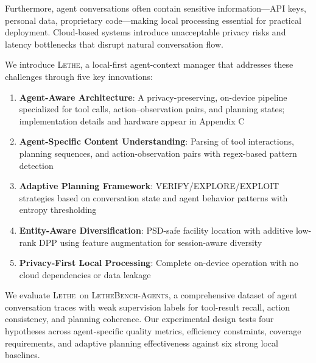 \documentclass[letterpaper]{article}
\newcommand{\lethe}{\textsc{Lethe}}
\newcommand{\lethebench}{\textsc{LetheBench-Agents}}
\begin{document}
Furthermore, agent conversations often contain sensitive information—API keys, personal data, proprietary code—making local processing essential for practical deployment. Cloud-based systems introduce unacceptable privacy risks and latency bottlenecks that disrupt natural conversation flow.

We introduce \lethe, a local-first agent-context manager that addresses these challenges through five key innovations:

\begin{enumerate}
    \item \textbf{Agent-Aware Architecture}: A privacy-preserving, on-device pipeline specialized for tool calls, action–observation pairs, and planning states; implementation details and hardware appear in Appendix C
    \item \textbf{Agent-Specific Content Understanding}: Parsing of tool interactions, planning sequences, and action-observation pairs with regex-based pattern detection
    \item \textbf{Adaptive Planning Framework}: VERIFY/EXPLORE/EXPLOIT strategies based on conversation state and agent behavior patterns with entropy thresholding
    \item \textbf{Entity-Aware Diversification}: PSD-safe facility location with additive low-rank DPP using feature augmentation for session-aware diversity
    \item \textbf{Privacy-First Local Processing}: Complete on-device operation with no cloud dependencies or data leakage
\end{enumerate}

We evaluate \lethe\ on \lethebench, a comprehensive dataset of agent conversation traces with weak supervision labels for tool-result recall, action consistency, and planning coherence. Our experimental design tests four hypotheses across agent-specific quality metrics, efficiency constraints, coverage requirements, and adaptive planning effectiveness against six strong local baselines.
\end{document}
